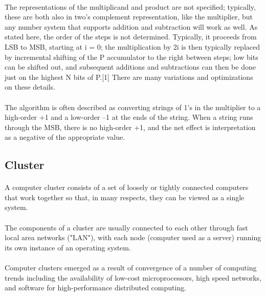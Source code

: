 \documentclass[a4paper,12pt]{article}
\begin{document}
	\paragraph{} The representations of the multiplicand and product are not specified; typically, these are both also in two's complement representation, like the multiplier, but any number system that supports addition and subtraction will work as well. As stated here, the order of the steps is not determined. Typically, it proceeds from LSB to MSB, starting at i = 0; the multiplication by 2i is then typically replaced by incremental shifting of the P accumulator to the right between steps; low bits can be shifted out, and subsequent additions and subtractions can then be done just on the highest N bits of P.[1] There are many variations and optimizations on these details.
	\paragraph{} The algorithm is often described as converting strings of 1's in the multiplier to a high-order +1 and a low-order –1 at the ends of the string. When a string runs through the MSB, there is no high-order +1, and the net effect is interpretation as a negative of the appropriate value.
		
	\subsection{Cluster}
	\paragraph{} A computer cluster consists of a set of loosely or tightly connected computers that work together so that, in many respects, they can be viewed as a single system. 
	
	\paragraph{} The components of a cluster are usually connected to each other through fast local area networks ("LAN"), with each node (computer used as a server) running its own instance of an operating system. 
	
	\paragraph{} Computer clusters emerged as a result of convergence of a number of computing trends including the availability of low-cost microprocessors, high speed networks, and software for high-performance distributed computing. 
	
\end{document}
